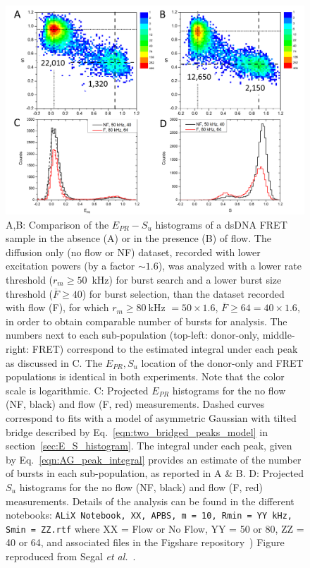\begin{figure}
\centering\includegraphics[width=\textwidth]{chapters/figures/ES_flow_noflow_comparison.png}
\caption{\label{fig:ES_flow_noflow_comparison} 
A,B: Comparison of the $E_{PR}-S_u$ histograms
of a dsDNA FRET sample in the absence (A) or in the presence (B) of flow.
The diffusion only (no flow or NF) dataset, recorded with lower excitation powers (by a factor $\sim1.6$), was analyzed with a lower rate threshold ($r_m \geq 50$~kHz) for burst search and a lower burst size threshold ($\overline{F} \geq 40$) for burst selection, than the dataset recorded with flow (F), for which $r_m \geq 80~$kHz $= 50 \times 1.6$, $\overline{F} \geq 64 = 40 \times 1.6$, in order to obtain comparable number of bursts for analysis.
The numbers next to each sub-population (top-left: donor-only, middle-right: FRET) correspond to the estimated integral under each peak as discussed in C. The $E_{PR},S_u$ location of the donor-only and FRET populations is identical in both experiments. 
Note that the color scale is logarithmic.
C: Projected $E_{PR}$ histograms for the no flow (NF, black) and flow (F, red) measurements. 
Dashed curves correspond to fits with a model of asymmetric Gaussian with tilted bridge described by Eq.~\ref{eqn:two_bridged_peaks_model} in section~\ref{sec:E_S_histogram}. 
The integral under each peak, given by Eq.~\ref{eqn:AG_peak_integral} provides an estimate of the number of bursts in each sub-population, as reported in A \& B.
D: Projected $S_u$ histograms for the no flow (NF, black) and flow (F, red) measurements.
Details of the analysis can be found in the different notebooks:
\texttt{ALiX Notebook, XX, APBS, m = 10, Rmin = YY kHz, Smin = ZZ.rtf} where XX = Flow or No Flow,
YY = 50 or 80, ZZ = 40 or 64, and associated files in the Figshare repository~\cite{figshare_repo_2019})
Figure reproduced from Segal \textit{et al.}~\cite{segal_methods_2019}.
}
\end{figure}

